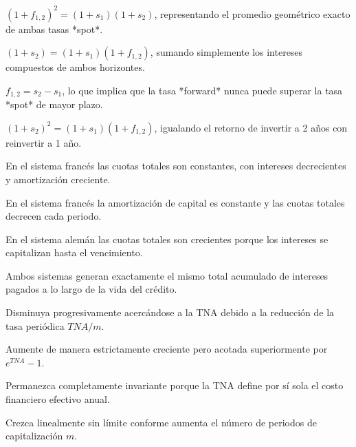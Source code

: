 \begin{opts}
    \item $(1 + f_{1,2})^2 = (1 + s_1)(1 + s_2)$, representando el promedio geométrico exacto de ambas tasas *spot*.
    \item $(1 + s_2) = (1 + s_1)(1 + f_{1,2})$, sumando simplemente los intereses compuestos de ambos horizontes.
    \item $f_{1,2} = s_2 - s_1$, lo que implica que la tasa *forward* nunca puede superar la tasa *spot* de mayor plazo.
    \item $(1 + s_2)^2 = (1 + s_1)(1 + f_{1,2})$, igualando el retorno de invertir a 2 años con reinvertir a 1 año.
\end{opts}

\begin{opts}
    \item En el sistema francés las cuotas totales son constantes, con intereses decrecientes y amortización creciente.
    \item En el sistema francés la amortización de capital es constante y las cuotas totales decrecen cada periodo.
    \item En el sistema alemán las cuotas totales son crecientes porque los intereses se capitalizan hasta el vencimiento.
    \item Ambos sistemas generan exactamente el mismo total acumulado de intereses pagados a lo largo de la vida del crédito.
\end{opts}

\begin{opts}
    \item Disminuya progresivamente acercándose a la TNA debido a la reducción de la tasa periódica $TNA/m$.
    \item Aumente de manera estrictamente creciente pero acotada superiormente por $e^{TNA} - 1$.
    \item Permanezca completamente invariante porque la TNA define por sí sola el costo financiero efectivo anual.
    \item Crezca linealmente sin límite conforme aumenta el número de periodos de capitalización $m$.
\end{opts}

